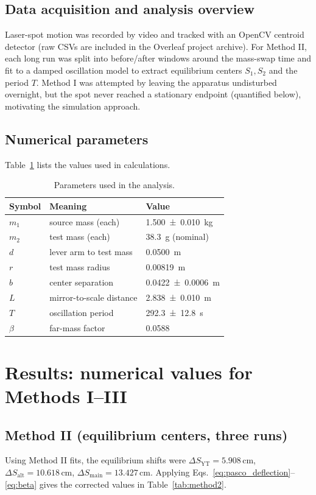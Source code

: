 \documentclass[11pt]{article}
\begin{document}
\subsection{Data acquisition and analysis overview}
Laser-spot motion was recorded by video and tracked with an OpenCV centroid detector (raw CSVs are included in the Overleaf project archive).
For Method II, each long run was split into before/after windows around the mass-swap time and fit to a damped oscillation model to extract equilibrium centers $S_1,S_2$ and the period $T$.
Method I was attempted by leaving the apparatus undisturbed overnight, but the spot never reached a stationary endpoint (quantified below), motivating the simulation approach.

\subsection{Numerical parameters}
Table~\ref{tab:params} lists the values used in calculations.

\begin{table}[H]
\centering
\caption{Parameters used in the analysis.}
\label{tab:params}
\begin{tabular}{@{}lll@{}}
\toprule
Symbol & Meaning & Value \\ \midrule
$m_1$ & source mass (each) & \SI{1.500\pm0.010}{kg} \\
$m_2$ & test mass (each) & \SI{38.3}{g} (nominal) \\
$d$ & lever arm to test mass & \SI{0.0500}{m} \\
$r$ & test mass radius & \SI{0.00819}{m} \\
$b$ & center separation & \SI{0.0422\pm0.0006}{m} \\
$L$ & mirror-to-scale distance & \SI{2.838\pm0.010}{m} \\
$T$ & oscillation period & \SI{292.3\pm12.8}{s} \\
$\beta$ & far-mass factor & 0.0588 \\ \bottomrule
\end{tabular}
\end{table}

\section{Results: numerical values for Methods I--III}
\subsection{Method II (equilibrium centers, three runs)}
Using Method II fits, the equilibrium shifts were
$\Delta S_{\mathrm{YT}}=5.908$\,cm,
$\Delta S_{\mathrm{alt}}=10.618$\,cm,
$\Delta S_{\mathrm{main}}=13.427$\,cm.
Applying Eqs.~\eqref{eq:pasco_deflection}--\eqref{eq:beta} gives the corrected values in Table~\ref{tab:method2}.
\end{document}
